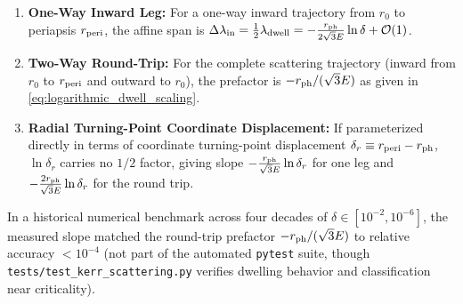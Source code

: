 \begin{enumerate}[label=(\roman*)]
    \item \textbf{One-Way Inward Leg:} For a one-way inward trajectory from $r_0$ to periapsis $r_{\rm peri}$, the affine span is $\Delta\lambda_{\rm in} = \frac{1}{2}\lambda_{\rm dwell} = -\frac{r_{\rm ph}}{2\sqrt{3}E}\ln\delta + \mathcal{O}(1)$.
    \item \textbf{Two-Way Round-Trip:} For the complete scattering trajectory (inward from $r_0$ to $r_{\rm peri}$ and outward to $r_0$), the prefactor is $-r_{\rm ph}/(\sqrt{3}E)$ as given in \eqref{eq:logarithmic_dwell_scaling}.
    \item \textbf{Radial Turning-Point Coordinate Displacement:} If parameterized directly in terms of coordinate turning-point displacement $\delta_r \equiv r_{\rm peri} - r_{\rm ph}$, $\ln\delta_r$ carries no $1/2$ factor, giving slope $-\frac{r_{\rm ph}}{\sqrt{3}E}\ln\delta_r$ for one leg and $-\frac{2r_{\rm ph}}{\sqrt{3}E}\ln\delta_r$ for the round trip.
\end{enumerate}
In a historical numerical benchmark across four decades of $\delta \in [10^{-2}, 10^{-6}]$, the measured slope matched the round-trip prefactor $-r_{\rm ph}/(\sqrt{3}E)$ to relative accuracy $< 10^{-4}$ (not part of the automated \texttt{pytest} suite, though \texttt{tests/test\_kerr\_scattering.py} verifies dwelling behavior and classification near criticality).
